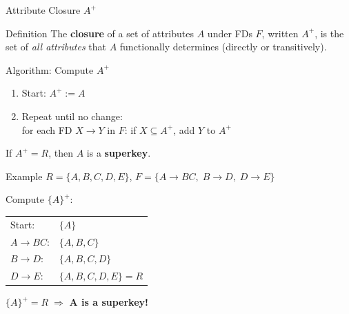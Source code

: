 \begin{frame}{Attribute Closure $A^+$}
  \begin{block}{Definition}
    The \textbf{closure} of a set of attributes $A$ under FDs $F$, written
    $A^+$, is the set of \emph{all attributes} that $A$ functionally determines
    (directly or transitively).
  \end{block}

  \begin{block}{Algorithm: Compute $A^+$}
    \begin{enumerate}
      \item Start: $A^+ := A$
      \item Repeat until no change:\\
            for each FD $X \to Y$ in $F$: if $X \subseteq A^+$, add $Y$ to $A^+$
    \end{enumerate}
    If $A^+ = R$, then $A$ is a \textbf{superkey}.
  \end{block}

  \begin{examples}{Example}
    $R = \{A,B,C,D,E\}$, \quad $F = \{A \to BC,\; B \to D,\; D \to E\}$

    Compute $\{A\}^+$:
    \begin{tabular}{ll}
      Start: & $\{A\}$ \\
      $A \to BC$: & $\{A,B,C\}$ \\
      $B \to D$: & $\{A,B,C,D\}$ \\
      $D \to E$: & $\{A,B,C,D,E\} = R$ \\
    \end{tabular}

    $\{A\}^+ = R \;\Rightarrow$ \textbf{A is a superkey!}
  \end{examples}
\end{frame}

